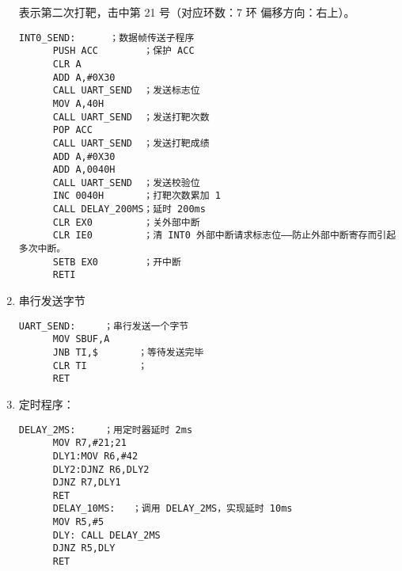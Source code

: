 \begin{enumerate}
  表示第二次打靶，击中第 21 号（对应环数：7 环 偏移方向：右上）。
  \begin{lstlisting}[basicstyle=\linespread{1.3}\selectfont, breaklines=true]
      INT0_SEND:      ；数据帧传送子程序
      PUSH ACC        ；保护 ACC
      CLR A
      ADD A,#0X30
      CALL UART_SEND  ；发送标志位
      MOV A,40H
      CALL UART_SEND  ；发送打靶次数
      POP ACC
      CALL UART_SEND  ；发送打靶成绩
      ADD A,#0X30
      ADD A,0040H
      CALL UART_SEND  ；发送校验位
      INC 0040H       ；打靶次数累加 1
      CALL DELAY_200MS；延时 200ms
      CLR EX0         ；关外部中断
      CLR IE0         ；清 INT0 外部中断请求标志位――防止外部中断寄存而引起多次中断。
      SETB EX0        ；开中断
      RETI
  \end{lstlisting}
  \item 串行发送字节
  \begin{lstlisting}[basicstyle=\linespread{1.3}\selectfont, breaklines=true]
      UART_SEND:     ；串行发送一个字节
      MOV SBUF,A
      JNB TI,$       ；等待发送完毕
      CLR TI         ；
      RET
  \end{lstlisting}
  \item 定时程序：
  \begin{lstlisting}[basicstyle=\linespread{1.3}\selectfont, breaklines=true]
      DELAY_2MS:     ；用定时器延时 2ms
      MOV R7,#21;21
      DLY1:MOV R6,#42
      DLY2:DJNZ R6,DLY2
      DJNZ R7,DLY1
      RET
      DELAY_10MS:   ；调用 DELAY_2MS，实现延时 10ms
      MOV R5,#5
      DLY: CALL DELAY_2MS
      DJNZ R5,DLY
      RET
\end{lstlisting}
\end{enumerate}